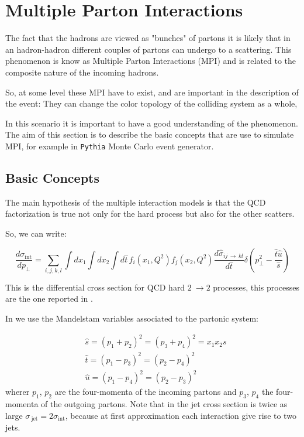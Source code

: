 \chapter{Multiple Parton Interactions}



The fact that the hadrons are viewed as "bunches" of partons it is likely that in an hadron-hadron different couples of partons can undergo to a scattering. This phenomenon is know as Multiple Parton Interactions (MPI) and is related to the composite nature of the incoming hadrons. 

So, at some level these MPI have to exist, and are important in the description of the event: They can change the color topology of the colliding system as a whole,  

In this scenario it is important to have a good understanding of the phenomenon. The aim of this section is to describe the basic concepts that are use to simulate MPI, for example in \texttt{Pythia} Monte Carlo event generator.

\section{Basic Concepts}

The main hypothesis of the multiple interaction models is that the QCD factorization is true not only for the hard process but also for the other scatters.

So, we can write:

\begin{equation}
	\frac{d\sigma_{\text{int}}}{dp_\perp}=\displaystyle\sum_{i,j,k,l}\displaystyle\int dx_1 \displaystyle\int dx_2 \displaystyle\int d\hat{t}\, f_i(x_1,Q^2)f_j(x_2,Q^2)\frac{d\hat{\sigma}_{ij\,\rightarrow\,kl}}{d\hat{t}}\delta\left( p_\perp^2-\frac{\hat{t}\hat{u}}{\hat{s}} \right)
	\label{eq:sigma_int1}
\end{equation}


This is the differential cross section for QCD hard $2\ \rightarrow 2$ processes, this processes are the one reported in . 

In  we use the Mandelstam variables associated to the partonic system:

\begin{align}
	&\hat{s}=(p_1+p_2)^2=(p_3+p_4)^2=x_1x_2s\\
	&\hat{t}=(p_1-p_3)^2=(p_2-p_4)^2\\
	&\hat{u}=(p_1-p_4)^2=(p_2-p_3)^2
\end{align} 
wherer $p_1$, $p_2$ are the four-momenta of the incoming partons and $p_3$, $p_4$ the four-momenta of the outgoing partons. 
Note that in  the jet cross section is twice as large $\sigma_{\ \text{jet}}=2\sigma_{\text{int}}$, because at first approximation each interaction give rise to two jets.

